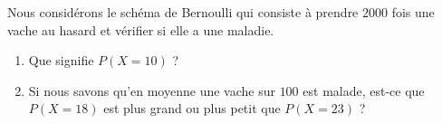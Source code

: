 
\begin{exercice}\label{exoPremiere-0077}

    Nous considérons le schéma de Bernoulli qui consiste à prendre \( 2000\) fois une vache au hasard et vérifier si elle a une maladie. 
    \begin{enumerate}
        \item
            Que signifie \( P(X=10)\) ?
        \item
            Si nous savons qu'en moyenne une vache sur \( 100\) est malade, est-ce que \( P(X=18)\) est plus grand ou plus petit que \( P(X=23)\) ?
    \end{enumerate}

\end{exercice}

